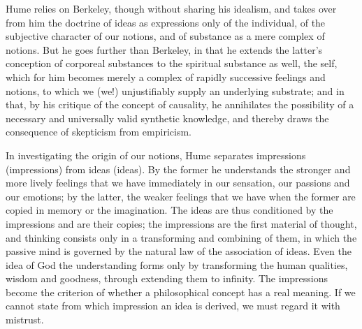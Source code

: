 \divrule

Hume relies on Berkeley, though without sharing his idealism, and
takes over from him the doctrine of ideas as expressions only of the
individual, of the subjective character of our notions, and of
substance as a mere complex of notions. But he goes further than
Berkeley, in that he extends the latter's conception of corporeal
substances to the spiritual substance as well, the self, which for him
becomes merely a complex of rapidly successive feelings and notions, to
which we (we!) unjustifiably supply an underlying substrate; and in
that, by his critique of the concept of causality, he annihilates the
possibility of a necessary and universally valid synthetic knowledge,
and thereby draws the consequence of skepticism from empiricism.

In investigating the origin of our notions, Hume separates impressions
(impressions) from ideas (ideas). By the former he understands the
stronger and more lively feelings that we have immediately in our
sensation, our passions and our emotions; by the latter, the weaker
feelings that we have when the former are copied in memory or the
imagination. The ideas are thus conditioned by the impressions and are
their copies; the impressions are the first material of thought, and
thinking consists only in a transforming and combining of them, in
which the passive mind is governed by the natural law of the
association of ideas. Even the idea of God the understanding forms only
by transforming the human qualities, wisdom and goodness, through
extending them to infinity. The impressions become the criterion of
whether a philosophical concept has a real meaning. If we cannot state
from which impression an idea is derived, we must regard it with
mistrust.

